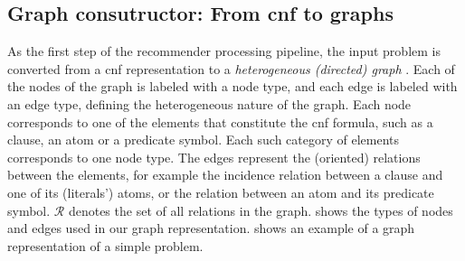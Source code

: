 \begin{figure}[h]

\fi

\end{figure}

\subsection{Graph consutructor: From \gls{cnf} to graphs}
\label{sec:graphifier}

As the first step of the recommender processing pipeline,
the input problem is converted from a \gls{cnf} representation
to a \emph{heterogeneous (directed) graph} \cite{Zhou2018}.
Each of the nodes of the graph is labeled with a node type,
and each edge is labeled with an edge type,
defining the heterogeneous nature of the graph.
Each node corresponds to one of the elements that constitute the \gls{cnf} formula,
such as a clause, an atom or a predicate symbol.
Each such category of elements corresponds to one node type.
The edges represent the (oriented) relations between the elements,
for example the incidence relation between a clause and one of its (literals') atoms,
or the relation between an atom and its predicate symbol.
$\mathcal{R}$ denotes the set of all relations in the graph.
 shows the types of nodes and edges used in our graph representation.
 shows an example of a graph representation of a simple problem.

